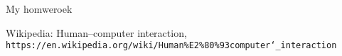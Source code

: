 \documentclass{homework}
\begin{document}

\newpage
\tableofcontents
\newpage


\begin{homework}[Objectives]
  My homweroek
\end{homework}

\begin{homework}[Conclusions]
\vspace{10pt}
\end{homework}

\begin{thebibliography}{9}
Wikipedia: Human–computer interaction,
\\\texttt{https://en.wikipedia.org/wiki/Human\%E2\%80\%93computer\char`_interaction}

\end{thebibliography}
\end{document}
